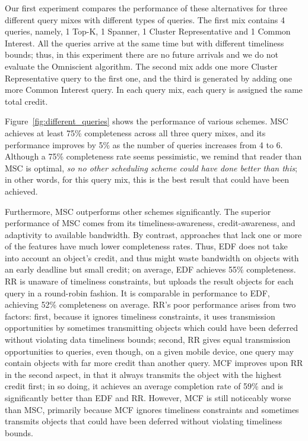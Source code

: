 %
Our first experiment compares the performance of these alternatives
for three different query mixes with different types of queries.
%
The first mix contains 4 queries, namely, 1 Top-K, 1 Spanner, 1
Cluster Representative and 1 Common Interest.
%
All the queries arrive at the same time but with different timeliness
bounds; thus, in this experiment there are no future arrivals and we
do not evaluate the Omniscient algorithm.
%
The second mix adds one more Cluster Representative query to the first
one, and the third is generated by adding one more Common Interest
query.
%
In each query mix, each query is assigned the same total credit.


Figure~\ref{fig:different_queries} shows the performance of various
schemes.
%
MSC achieves at least 75\% completeness across all three query mixes,
and its performance improves by 5\% as the number of queries increases
from 4 to 6.
%
Although a 75\% completeness rate seems pessimistic, we remind that
reader than MSC is optimal, \emph{so no other scheduling scheme could
  have done better than this}; in other words, for this query mix,
this is the best result that could have been achieved.

Furthermore, MSC outperforms other schemes significantly.
%
The superior performance of MSC comes from its
timeliness-awareness, credit-awareness, and adaptivity to available
bandwidth.
%
By contrast, approaches that lack one or more of the features have
much lower completeness rates.
%
Thus, EDF does not take into account an object's credit, and thus
might waste bandwidth on objects with an early deadline but small
credit; on average, EDF achieves 55\% completeness.
%
RR is unaware of timeliness constraints, but uploads the result
objects for each query in a round-robin fashion.
%
It is comparable in performance to EDF, achieving 52\% completeness on
average. %
%
RR's poor performance arises from two factors: first, because it
ignores timeliness constraints, it uses transmission opportunities by
sometimes transmitting objects which could have been deferred without
violating data timeliness bounds; second, RR gives equal transmission
opportunities to queries, even though, on a given mobile device, one
query may contain objects with far more credit than another query.
%
MCF improves upon RR in the second aspect, in that it always transmits
the object with the highest credit first; in so doing, it achieves an
average completion rate of 59\% and is significantly better than EDF
and RR. %
%
However, MCF is still noticeably worse than MSC, primarily because MCF
ignores timeliness constraints and sometimes transmits objects that
could have been deferred without violating timeliness bounds.

